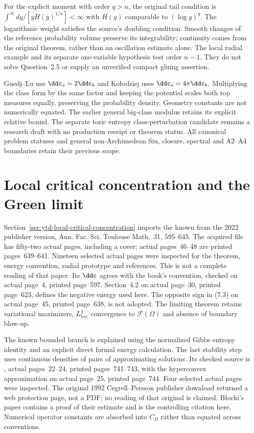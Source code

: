 For the explicit moment with order $q>n$, the original tail condition
is $\int^{\infty}dy/[yH(y)^{1/n}]<\infty$ with $H(y)$ comparable
to $(\log y)^q$. The logarithmic weight satisfies the source's
doubling condition. Smooth changes of the reference probability
volume preserve its integrability; continuity comes from the
original theorem, rather than an oscillation estimate alone.
The local radial example and its separate one-variable hypothesis
test order $n-1$. They do not solve Question~2.5 or supply an
unverified compact gluing assertion.

Guedj--Lu use $\ddc_s=2\ddc_b$ and Ko\l odziej uses
$\ddc_s=4\pi\ddc_b$. Multiplying the class form by the same
factor and keeping the potential scales both top measures
equally, preserving the probability density. Geometry constants
are not numerically equated. The earlier general big-class modulus
retains its explicit relative bound. The separate toric entropy
class-perturbation candidate remains a research draft with no
production receipt or theorem status. All canonical problem
statuses and general non-Archimedean Siu, closure, spectral and
A2--A4 boundaries retain their previous scope.

\section{Local critical concentration and the Green limit}
\label{sec:provenance-local-critical-concentration}

Section~\ref{sec:ytd-local-critical-concentration} imports the known
\cite[Theorems~7.2 and~7.4]{BB22MTPublished} from the 2022
publisher version, Ann. Fac. Sci. Toulouse Math.\ 31, 595--645.
The acquired file has fifty-two actual pages, including a cover;
actual pages~46--48 are printed pages~639--641. Nineteen selected
actual pages were inspected for the theorem, energy convention,
radial prototype and references. This is not a complete reading
of that paper. Its $\ddc$ agrees with the book's convention,
checked on actual page~4, printed page~597.
Section~4.2 on actual page~30, printed page~623, defines the
negative energy used here. The opposite sign in (7.3) on actual
page~45, printed page~638, is not adopted. The limiting theorem
retains variational maximizers, $L^1_{\rm loc}$ convergence to
$\mathcal F(\Omega)$ and absence of boundary blow-up.

The known bounded branch is explained using the normalized Gibbs
entropy identity and an explicit direct formal energy calculation.
The last stability step uses continuous densities of pairs of
approximating solutions. Its checked source is
\cite[Theorems~5.1(i) and~5.3]{Blocki96HyperconvexPublished},
actual pages~22--24, printed pages~741--743, with the
hyperconvex approximation on actual page~25, printed page~744.
Four selected actual pages were inspected. The original 1992
Cegrell--Persson publisher download returned a web protection page,
not a PDF; no reading of that original is claimed. B\l ocki's
paper contains a proof of their estimate and is the controlling
citation here. Numerical operator constants are absorbed into
$C_\Omega$ rather than equated across conventions.

